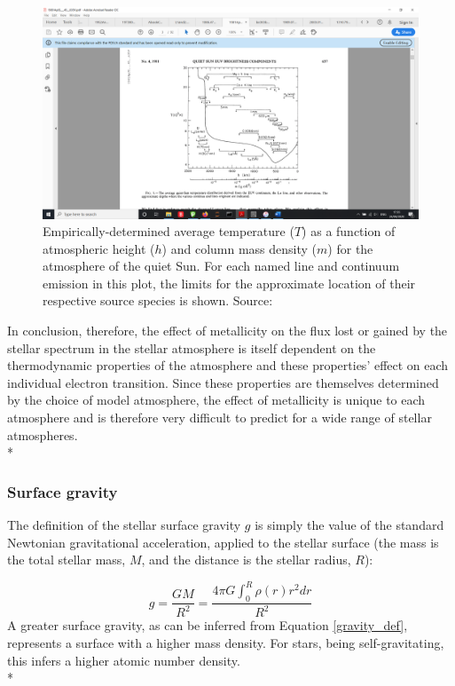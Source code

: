 \documentclass[12pt, a4paper]{report}
\begin{document}
\begin{figure}[h!]
\begin{center}
\includegraphics[width=1.0\textwidth]{1981_vernazza_solar_chromosphere_structure.png}
\caption{Empirically-determined average temperature ($T$) as a function of atmospheric height ($h$) and column mass density ($m$) for the atmosphere of the  quiet Sun. For each named line and continuum emission in this plot, the limits for the approximate location of their respective source species is shown. Source: \cite{1981ApJS...45..635V}}
\label{sun_atmopshere_structure}
\end{center}
\end{figure}

In conclusion, therefore, the effect of metallicity on the flux lost or gained by the stellar spectrum in the stellar atmosphere is itself dependent on the thermodynamic properties of the atmosphere and these properties' effect on each individual electron transition. Since these properties are themselves determined by the choice of model atmosphere, the effect of metallicity is unique to each atmosphere and is therefore very difficult to predict for a wide range of stellar atmospheres.\\*


\subsubsection{Surface gravity}

The definition of the stellar surface gravity $g$ is simply the value of the standard Newtonian gravitational acceleration, applied to the stellar surface (the mass is the total stellar mass, $M$, and the distance is the stellar radius, $R$):

\begin{equation}
g = \frac{GM}{R^{2}} = \frac{4\pi G\int_{0}^{R}\rho(r)r^{2}dr}{R^{2}}
\label{gravity_def}
\end{equation}
A greater surface gravity, as can be inferred from Equation \ref{gravity_def}, represents a surface with a higher mass density. For stars, being self-gravitating, this infers a higher atomic number density.  \\*
\end{document}
